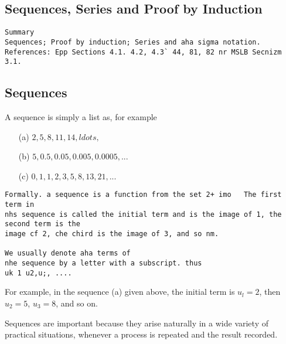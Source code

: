 \documentclass[]{article}
\begin{document}
\subsection*{Sequences, Series and Proof
by Induction}

\begin{verbatim}
Summary
Sequences; Proof by induction; Series and aha sigma notation.
References: Epp Sections 4.1. 4.2, 4.3` 44, 81, 82 nr MSLB Secnizm 3.1.
\end{verbatim}
\subsection{Sequences}

A sequence is simply a list as, for example
\begin{itemize}
\item[(a)] $2,5,8,11,14, ldots,$
\item[(b)] $5,0.5,0.05,0.005,0.0005,...$
\item[(c)] $0,1,1,2,3,5,8,13,21,...$
\end{itemize}
\begin{verbatim}
Formally. a sequence is a function from the set 2+ imo   The first term in
nhs sequence is called the initial term and is the image of 1, the second term is the
image cf 2, che chird is the image of 3, and so nm. 

We usually denote aha terms of
nhe sequence by a letter with a subscript. thus
uk 1 u2,u;, ....

\end{verbatim}
For example, in the sequence (a) given above, the initial term is $u_l = 2$, then $u_2 = 5$,
$u_3 = 8$, and so on.


Sequences are important because they arise naturally in a wide variety of practical situations, whenever a process is repeated and the result recorded.
\end{document}
